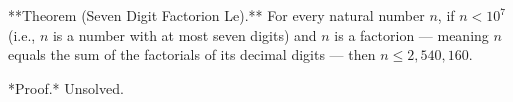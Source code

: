 
**Theorem (Seven Digit Factorion Le).** For every natural number $n$, if $n < 10^7$ (i.e., $n$ is a number with at most seven digits) and $n$ is a factorion — meaning $n$ equals the sum of the factorials of its decimal digits — then $n \leq 2{,}540{,}160$.

*Proof.* Unsolved.